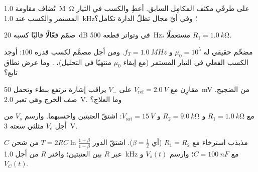 \begin{exercise}[$\star\star$]\label{exo:b1:operational-amplifier:7}
تُضاف مقاومة \qty{1.0}{M\ohm} على طرفَي مكثف المكامِل
السابق. أعطِ  والكسب في التيار المستمر  والكسب عند \qty{1.0}{kHz}؛ وفي أيّ مجال تظلّ
الدارة تكامل؟
\end{exercise}

\begin{exercise}[$\star\star$]\label{exo:b1:operational-amplifier:8}
صمّم  فعّالًا قالبًا كسبه \qty{20}{dB} في
 وتواتر قطعه \qty{500}{Hz}، مستعملًا $R_1 = \qty{1.0}{k\ohm}$.
\end{exercise}

\begin{exercise}[$\star\star$]\label{exo:b1:operational-amplifier:9}
مضخّم حقيقي له $\mu_0 = 10^5$ و $f_T = \qty{1.0}{MHz}$. ومن أجل
 مصمَّم لكسب قدره $100$: أوجد الكسب الفعلي في التيار المستمر
(مع إبقاء $\mu_0$ منتهيًا في التحليل)، . وما عرض نطاق
تابع؟
\end{exercise}

\begin{exercise}[$\star\star\star$]\label{exo:b1:operational-amplifier:10}
مقارِن مع $V_{\mathrm{ref}} = \qty{2.0}{V}$ على $V_-$ يراقب
إشارة ترتفع ببطء وتحمل \qty{50}{mV} من الضجيج. صف الخرج
وهي تعبر \qty{2.0}{V}. وما العلاج؟
\end{exercise}

\begin{exercise}[$\star\star\star$]\label{exo:b1:operational-amplifier:11}
 مع $R_1 = \qty{1.0}{k\ohm}$ و $R_2 = \qty{9.0}{k\ohm}$ و
$V_{\mathrm{sat}} = \qty{15}{V}$: اشتقّ العتبتين واحسبهما.
وارسم $V_s$ من أجل $V_e$ مثلثي سعته \qty{3}{V}.
\end{exercise}

\begin{exercise}[$\star\star\star$]\label{exo:b1:operational-amplifier:12}
مذبذب استرخاء مع $R_1 = R_2$ (أي $\beta = \tfrac12$). اشتقّ
الدور $T = 2RC\ln\frac{1 + \beta}{1 - \beta}$ من شحن $C$
عبر $R$ بين العتبتين؛ واختر $R$ من أجل \qty{1.0}{kHz}
مع $C = \qty{100}{nF}$؛ وارسم $V_s(t)$ و $V_C(t)$.
\end{exercise}

